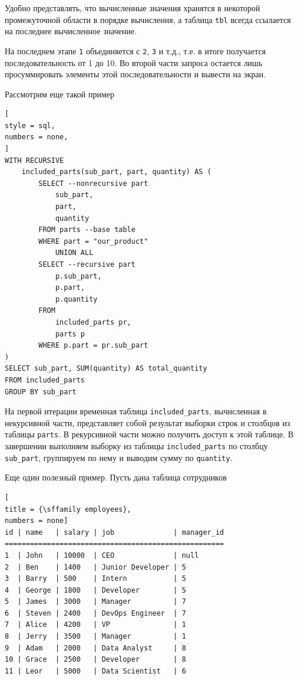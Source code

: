 \documentclass[%
	11pt,
	a4paper,
	utf8,
		]{article}
\begin{document}
Удобно представлять, что вычисленные значения хранятся в некоторой промежуточной области в порядке вычисления, а таблица \texttt{tbl} всегда ссылается на последнее вычисленное значение.

На последнем этапе \texttt{1} объединяется с \texttt{2}, \texttt{3} и т.д., т.е. в итоге получается последовательность от 1 до 10. Во второй части запроса остается лишь просуммировать элементы этой последовательности и вывести на экран.

Рассмотрим еще такой пример

\begin{lstlisting}[
style = sql,
numbers = none,
]
WITH RECURSIVE
    included_parts(sub_part, part, quantity) AS (
        SELECT --nonrecursive part
            sub_part,
            part,
            quantity
        FROM parts --base table
        WHERE part = "our_product"
            UNION ALL
        SELECT --recursive part
            p.sub_part,
            p.part,
            p.quantity
        FROM
            included_parts pr,
            parts p
        WHERE p.part = pr.sub_part
)
SELECT sub_part, SUM(quantity) AS total_quantity
FROM included_parts
GROUP BY sub_part
\end{lstlisting}

На первой итерации временная таблица \texttt{included\_parts}, вычисленная в некурсивной части, представляет собой результат выборки строк и столбцов из таблицы \texttt{parts}. В рекурсивной части можно получить доступ к этой таблице. В завершении выполняем выборку из таблицы \texttt{included\_parts} по столбцу \texttt{sub\_part}, группируем по нему и выводим сумму по \texttt{quantity}.

Еще один полезный пример. Пусть дана таблица сотрудников

\begin{lstlisting}[
title = {\sffamily employees},
numbers = none]
id | name   | salary | job              | manager_id
====================================================
1  | John   | 10000  | CEO              | null
2  | Ben    | 1400   | Junior Developer | 5
3  | Barry  | 500    | Intern           | 5
4  | George | 1800   | Developer        | 5
5  | James  | 3000   | Manager          | 7
6  | Steven | 2400   | DevOps Engineer  | 7
7  | Alice  | 4200   | VP               | 1
8  | Jerry  | 3500   | Manager          | 1
9  | Adam   | 2000   | Data Analyst     | 8
10 | Grace  | 2500   | Developer        | 8
11 | Leor   | 5000   | Data Scientist   | 6
\end{lstlisting}
\end{document}
